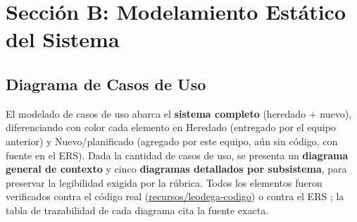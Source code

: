 \chapter{Sección B: Modelamiento Estático del Sistema}

\section{Diagrama de Casos de Uso}
\sloppy

El modelado de casos de uso abarca el \textbf{sistema completo} (heredado + nuevo), diferenciando con color cada elemento en Heredado (entregado por el equipo anterior) y Nuevo/planificado (agregado por este equipo, aún sin código, con fuente en el ERS). Dada la cantidad de casos de uso, se presenta un \textbf{diagrama general de contexto} y cinco \textbf{diagramas detallados por subsistema}, para preservar la legibilidad exigida por la rúbrica. Todos los elementos fueron verificados contra el código real (\url{recursos/leodega-codigo}) o contra el ERS \cite{ref21}; la tabla de trazabilidad de cada diagrama cita la fuente exacta.

